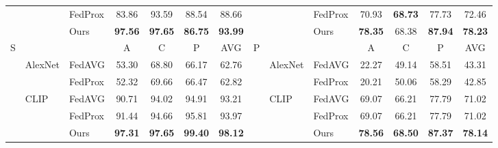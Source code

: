 \begin{table}[t!]
{\begin{tabular}{cllcccc|cllcccc}
                             &                              & FedProx & 83.86          & 93.59          & 88.54          & 88.66          &                            &                              & FedProx & 70.93          & \textbf{68.73} & 77.73          & 72.46          \\
                             &                              & Ours    & \textbf{97.56} & \textbf{97.65} & \textbf{86.75} & \textbf{93.99} &                            &                              & Ours    & \textbf{78.35} & 68.38          & \textbf{87.94} & \textbf{78.23} \\ \midrule
\multirow{6}{*}{S}           & \multicolumn{1}{l}{}         &         & A              & C              & P              & AVG            & \multirow{6}{*}{P}         & \multicolumn{1}{l}{}         &         & A              & C              & P              & AVG            \\
                             & \multirow{2}{*}{AlexNet}     & FedAVG  & 53.30          & 68.80          & 66.17          & 62.76          &                            & \multirow{2}{*}{AlexNet}     & FedAVG  & 22.27          & 49.14          & 58.51          & 43.31          \\
                             &                              & FedProx & 52.32          & 69.66          & 66.47          & 62.82          &                            &                              & FedProx & 20.21          & 50.06          & 58.29          & 42.85          \\
                             & \multirow{3}{*}{CLIP}        & FedAVG  & 90.71          & 94.02          & 94.91          & 93.21          &                            & \multirow{3}{*}{CLIP}        & FedAVG  & 69.07          & 66.21          & 77.79          & 71.02          \\
                             &                              & FedProx & 91.44          & 94.66          & 95.81          & 93.97          &                            &                              & FedProx & 69.07          & 66.21          & 77.79          & 71.02          \\
                             &                              & Ours    & \textbf{97.31} & \textbf{97.65} & \textbf{99.40} & \textbf{98.12} &                            &                              & Ours    & \textbf{78.56} & \textbf{68.50} & \textbf{87.37} & \textbf{78.14} \\ \bottomrule
\end{tabular}}
\end{table}